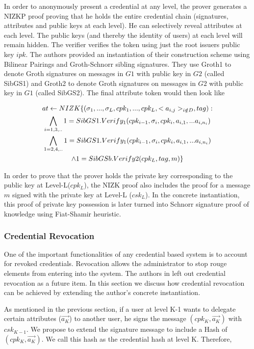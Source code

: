 \documentclass[journal]{IEEEtran}
\begin{document}
In order to anonymously present a credential at any level, the prover generates a NIZKP proof proving that he holds the entire credential chain (signatures, attributes and public keys at each level). He can selectively reveal attributes at each level. The public keys (and thereby the identity of users) at each level will remain hidden. The verifier verifies the token using just the root issuers public key $ipk$. The authors provided an instantiation of their construction scheme using Bilinear Pairings and Groth-Schnorr sibling signatures. They use Groth1 to denote Groth signatures on messages in $G1$ with public key in $G2$ (called SibGS1) and Groth2 to denote Groth signatures on messages in $G2$ with public key in $G1$ (called SibGS2). The final attribute token would then look like

\begin{multline}
$$
at \leftarrow NIZK \lbrace(\sigma_1,...,\sigma_L,cpk_1,...,cpk_L,<a_{i,j}>_{i \notin D},tag) : \\ 
\bigwedge \limits _{i=1,3,..} 1 = SibGS1.Verify_1(cpk_{i-1}, \sigma_i,cpk_i,a_{i,1},...a_{i,n_i})\\
\bigwedge \limits _{1=2,4,..} 1 = SibGS1.Verify_1(cpk_{i-1}, \sigma_i,cpk_i,a_{i,1},...a_{i,n_i})\\
\wedge 1 = SibGSb.Verify2(cpk_L,tag,m)\rbrace
$$
\end{multline}

In order to prove that the prover holds the private key corresponding to the public key at Level-L($cpk_L$), the NIZK proof also includes the proof for a message $m$ signed with the private key at Level-L ($csk_L$). In the concrete instantiation, this proof of private key possession is later turned into Schnorr signature proof of knowledge using Fiat-Shamir heuristic.

\subsubsection{Credential Revocation} \label{revoke}
One of the important functionalities of any credential based system is to account for revoked credentials. Revocation allows the administrator to stop rouge elements from entering into the system. The authors in \citep{CamenischDD17} left out credential revocation as a future item. In this section we discuss how credential revocation can be achieved by extending the author's concrete instantiation.

As mentioned in the previous section, if a user at level K-1 wants to delegate certain attributes ($\overrightarrow{a_K}$) to another user, he signs the message $(cpk_K,\overrightarrow{a_K})$ with $csk_{K-1}$. We propose to extend the signature message to include a Hash of $(cpk_K , \overrightarrow{a_K})$. We call this hash as the credential hash at level K. Therefore,
\end{document}
